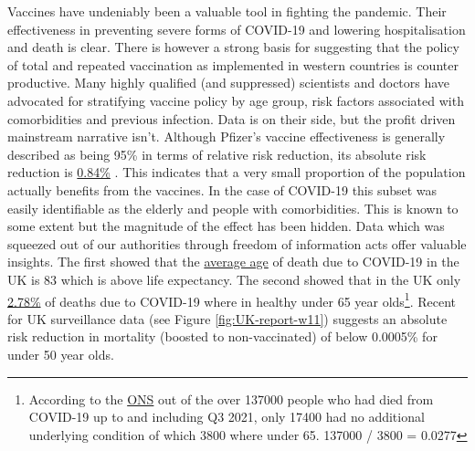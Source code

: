 \documentclass[11pt,a4paper,notitlepage]{report}
\begin{document}
Vaccines have undeniably been a valuable tool in fighting the pandemic. Their effectiveness in preventing severe forms of COVID-19 and lowering hospitalisation and death is clear. There is however a strong basis for suggesting that the policy of total and repeated vaccination as implemented in western countries is counter productive. Many highly qualified (and suppressed) scientists and doctors have advocated for stratifying vaccine policy by age group, risk factors associated with comorbidities and previous infection. Data is on their side, but the profit driven mainstream narrative isn't. Although Pfizer's vaccine effectiveness is generally described as being 95\% in terms of relative risk reduction, its absolute risk reduction is \href{https://www.thelancet.com/journals/lanmic/article/PIIS2666-5247(21)00069-0/fulltext}{0.84\%} \cite{lancet20042021}. This indicates that a very small proportion of the population actually benefits from the vaccines. In the case of COVID-19 this subset was easily identifiable as the elderly and people with comorbidities. This is known to some extent but the magnitude of the effect has been hidden. Data which was squeezed out of our authorities through freedom of information acts offer valuable insights. The first showed that the \href{https://www.ons.gov.uk/aboutus/transparencyandgovernance/freedomofinformationfoi/averageageofthosewhohaddiedwithcovid19}{average age} of death due to COVID-19 in the UK is 83 \cite{freedomofinformationfoi11012021} which is above life expectancy. The second showed that in the UK only \href{https://www.ons.gov.uk/aboutus/transparencyandgovernance/freedomofinformationfoi/deathsfromcovid19withnootherunderlyingcauses}{2.78\%} \cite{freedomofinformationfoi16122021} of deaths due to COVID-19 where in healthy under 65 year olds\footnote{According to the \href{https://www.ons.gov.uk/aboutus/transparencyandgovernance/freedomofinformationfoi/deathsfromcovid19withnootherunderlyingcauses}{ONS} \cite{freedomofinformationfoi16122021} out of the over 137000 people who had died from COVID-19 up to and including Q3 2021, only 17400 had no additional underlying condition of which 3800 where under 65. 137000 / 3800 = 0.0277}. Recent  for UK surveillance data (see Figure \ref{fig:UK-report-w11}) suggests an absolute risk reduction in mortality (boosted to non-vaccinated) of below 0.0005\% for under 50 year olds.

\end{document}
